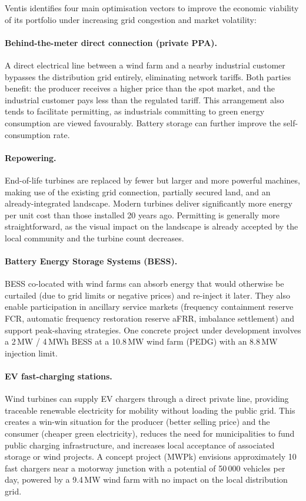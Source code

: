 Ventis identifies four main optimisation vectors to improve the economic viability of its
portfolio under increasing grid congestion and market volatility:

\paragraph{Behind-the-meter direct connection (private PPA).}
A direct electrical line between a wind farm and a nearby industrial customer bypasses the
distribution grid entirely, eliminating network tariffs. Both parties benefit: the producer
receives a higher price than the spot market, and the industrial customer pays less than the
regulated tariff. This arrangement also tends to facilitate permitting, as industrials
committing to green energy consumption are viewed favourably. Battery storage can further
improve the self-consumption rate.

\paragraph{Repowering.}
End-of-life turbines are replaced by fewer but larger and more powerful machines, making use
of the existing grid connection, partially secured land, and an already-integrated landscape.
Modern turbines deliver significantly more energy per unit cost than those installed 20 years
ago. Permitting is generally more straightforward, as the visual impact on the landscape is
already accepted by the local community and the turbine count decreases.

\paragraph{Battery Energy Storage Systems (BESS).}
BESS co-located with wind farms can absorb energy that would otherwise be curtailed (due to
grid limits or negative prices) and re-inject it later. They also enable participation in
ancillary service markets (frequency containment reserve FCR, automatic frequency restoration
reserve aFRR, imbalance settlement) and support peak-shaving strategies. One concrete project
under development involves a 2\,MW / 4\,MWh BESS at a 10.8\,MW wind farm (PEDG) with an
8.8\,MW injection limit.

\paragraph{EV fast-charging stations.}
Wind turbines can supply EV chargers through a direct private line, providing traceable
renewable electricity for mobility without loading the public grid. This creates a win-win
situation for the producer (better selling price) and the consumer (cheaper green electricity),
reduces the need for municipalities to fund public charging infrastructure, and increases
local acceptance of associated storage or wind projects. A concept project (MWPk) envisions
approximately 10 fast chargers near a motorway junction with a potential of 50\,000 vehicles
per day, powered by a 9.4\,MW wind farm with no impact on the local distribution grid.

